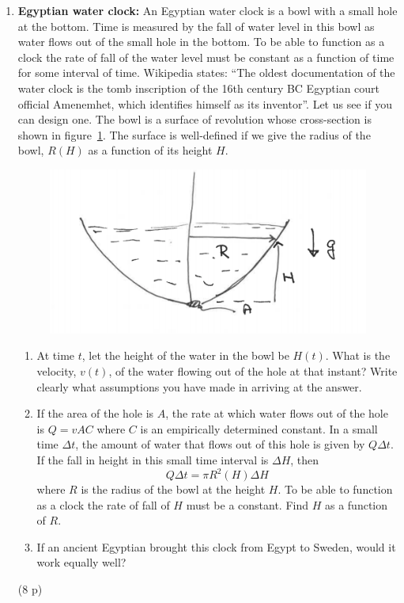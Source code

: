 \documentclass[12pt,a4paper]{article}
\begin{document}
\begin{enumerate}
\item {\bf Egyptian water clock:}
  An Egyptian water clock is a bowl with a small hole at the
  bottom. Time is measured by the fall of water level in this bowl as
  water flows out of the small hole in the bottom. To be able to
  function as a clock the rate of fall of the water level must be
  constant as a function of time for some interval of time.
  Wikipedia states: ``The oldest documentation of the water clock is
  the tomb  inscription
  of the 16th century BC Egyptian court official Amenemhet,
  which identifies himself as its inventor''. Let us see if you can
  design one. The bowl is a surface of revolution whose
  cross-section is shown in figure~\ref{fig:clock}.
  The surface is well-defined if we give the radius of the bowl, $R(H)$
  as a function of its height $H$.
  \begin{figure}[h]
    \begin{center}
      \includegraphics[width=0.5\linewidth]{egypt.png}
     \end{center}
    \label{fig:clock}
   \end{figure}
  \begin{enumerate}
\item At time $t$, let the height of the water in the bowl be
  $H(t)$. What is the velocity, $v(t)$, of the water flowing out of the hole at
  that instant?  Write clearly what assumptions you have made in
  arriving at the answer.
  \item If the area of the hole is $A$, the rate at which water flows
    out of the hole is $Q = v A C $ where $C$ is an empirically
    determined constant. In a small time $\Delta t$, the amount of
    water that flows out of this hole is given by $Q\Delta t$. If the
    fall in height in this small time interval is $\Delta H$, then
    \begin{equation}
      Q\Delta t = \pi R^2(H)\Delta H
      \end{equation}
    where $R$ is the radius of the bowl at the height $H$. To be able
    to function as a clock the rate of fall of $H$ must be a
    constant. Find $H$ as a function of $R$.
  \item If an ancient Egyptian brought this clock from Egypt to Sweden,
    would it work equally well? 
  \end{enumerate}

(8 p) \\  
  



  \end{enumerate}
\end{document}
